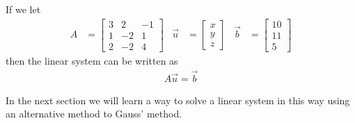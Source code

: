 If we let 
\begin{align*}
	A & = 
\begin{bmatrix}
3 & 2 & -1 \\ 1 & -2 & 1 \\ 2 & -2 & 4 
\end{bmatrix} & \vec{u} & =\begin{bmatrix}
x \\ y \\ z 
\end{bmatrix} & \vec{b} & = \begin{bmatrix}
10 \\ 11 \\ 5
\end{bmatrix}
\end{align*}
then the linear system can be written as 
%
\begin{align*}
	A\vec{u}=\vec{b}
\end{align*}

In the next section we will learn a way to solve a linear system in this way using an alternative method to Gauss' method.  


%
%
%	
%




